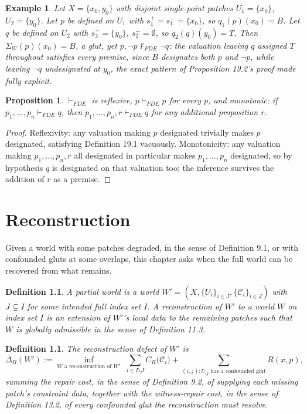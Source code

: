 \documentclass[11pt]{book}
\newtheorem{definition}[theorem]{Definition}
\newtheorem{proposition}[theorem]{Proposition}
\newtheorem{example}[theorem]{Example}
\begin{document}
\begin{example}
Let $X = \{x_0,y_0\}$ with disjoint single-point patches $U_1=\{x_0\}$, $U_2=\{y_0\}$. Let $p$ be defined on $U_1$ with $s_1^+=s_1^-=\{x_0\}$, so $q_1(p)(x_0)=B$. Let $q$ be defined on $U_2$ with $s_2^+=\{y_0\}$, $s_2^-=\emptyset$, so $q_2(q)(y_0)=T$. Then $\Sigma_W(p)(x_0)=B$, a glut, yet $p,\neg p \not\vdash_{FDE} \neg q$: the valuation leaving $q$ assigned $T$ throughout satisfies every premise, since $B$ designates both $p$ and $\neg p$, while leaving $\neg q$ undesignated at $y_0$, the exact pattern of Proposition 19.2's proof made fully explicit.
\end{example}

\begin{proposition}
$\vdash_{FDE}$ is reflexive, $p \vdash_{FDE} p$ for every $p$, and monotonic: if $p_1,\dots,p_n \vdash_{FDE} q$, then $p_1,\dots,p_n,r \vdash_{FDE} q$ for any additional proposition $r$.
\end{proposition}

\begin{proof}
Reflexivity: any valuation making $p$ designated trivially makes $p$ designated, satisfying Definition 19.1 vacuously. Monotonicity: any valuation making $p_1,\dots,p_n,r$ all designated in particular makes $p_1,\dots,p_n$ designated, so by hypothesis $q$ is designated on that valuation too; the inference survives the addition of $r$ as a premise.
\end{proof}

\chapter{Reconstruction}

Given a world with some patches degraded, in the sense of Definition 9.1, or with confounded gluts at some overlaps, this chapter asks when the full world can be recovered from what remains.

\begin{definition}
A \emph{partial world} is a world $W' = (X, \{U_i\}_{i \in J}, \{\mathcal C_i\}_{i \in J})$ with $J \subsetneq I$ for some intended full index set $I$. A \emph{reconstruction} of $W'$ to a world $W$ on index set $I$ is an extension of $W'$'s local data to the remaining patches such that $W$ is globally admissible in the sense of Definition 11.3.
\end{definition}

\begin{definition}
The \emph{reconstruction defect} of $W'$ is
\[
\Delta_R(W') := \inf_{W \text{ a reconstruction of } W'} \; \sum_{i \in I \setminus J} C_R\big(\mathcal C_i\big) + \sum_{(i,j) : U_{ij} \text{ has a confounded glut}} R(x, p),
\]
summing the repair cost, in the sense of Definition 9.2, of supplying each missing patch's constraint data, together with the witness-repair cost, in the sense of Definition 13.2, of every confounded glut the reconstruction must resolve.
\end{definition}
\end{document}
